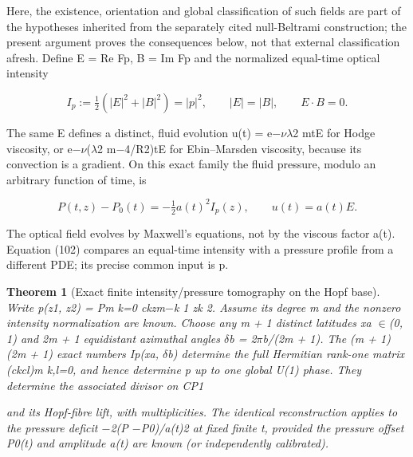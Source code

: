 \documentclass[10pt,letterpaper]{article}
\newtheorem{theorem}{Theorem}[section]
\theoremstyle{remark}
\begin{document}
Here, the existence, orientation and global classification of such fields are part of the hypotheses inherited from the separately cited null-Beltrami construction; the present argument proves the consequences below, not that external classification afresh. Define E = Re Fp, B = Im Fp and the normalized equal-time optical intensity



\begin{equation}
\tag{101}\label{eq:101}
I_p:=\tfrac12(|E|^2+|B|^2)=|p|^2,\qquad|E|=|B|,\qquad E\cdot B=0.
\end{equation}

The same E defines a distinct, fluid evolution u(t) = e\(- \nu \lambda \)2 mtE for Hodge viscosity, or e\(- \nu \)(\(\lambda \)2 m\(- \)4/R2)tE for Ebin–Marsden viscosity, because its convection is a gradient. On this exact family the fluid pressure, modulo an arbitrary function of time, is



\begin{equation}
\tag{102}\label{eq:102}
P(t,z)-P_0(t)=-\tfrac12a(t)^2I_p(z),\qquad u(t)=a(t)E.
\end{equation}

The optical field evolves by Maxwell’s equations, not by the viscous factor a(t). Equation (102) compares an equal-time intensity with a pressure profile from a different PDE; its precise common input is p.


\begin{theorem}[Exact finite intensity/pressure tomography on the Hopf base]

Write p(z1, z2) = Pm k=0 ckzm\(- \)k 1 zk 2. Assume its degree m and the nonzero intensity normalization are known. Choose any m + 1 distinct latitudes xa \(\in \)(0, 1) and 2m + 1 equidistant azimuthal angles \(\delta \)b = 2\(\pi \)b/(2m + 1). The (m + 1)(2m + 1) exact numbers Ip(xa, \(\delta \)b) determine the full Hermitian rank-one matrix (ckcl)m k,l=0, and hence determine p up to one global U(1) phase. They determine the associated divisor on CP1

and its Hopf-fibre lift, with multiplicities. The identical reconstruction applies to the pressure deficit \(- \)2(P \(- \)P0)/a(t)2 at fixed finite t, provided the pressure offset P0(t) and amplitude a(t) are known (or independently calibrated).


\end{theorem}
\end{document}
